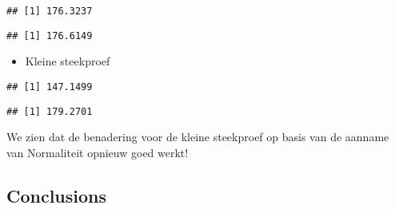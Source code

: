 \documentclass[
  12pt,dutch,coursenotes]{book}
\newenvironment{Shaded}{\begin{snugshade}}{\end{snugshade}}
\newcommand{\DataTypeTok}[1]{\textcolor[rgb]{0.13,0.29,0.53}{#1}}
\newcommand{\DecValTok}[1]{\textcolor[rgb]{0.00,0.00,0.81}{#1}}
\newcommand{\FloatTok}[1]{\textcolor[rgb]{0.00,0.00,0.81}{#1}}
\newcommand{\KeywordTok}[1]{\textcolor[rgb]{0.13,0.29,0.53}{\textbf{#1}}}
\newcommand{\NormalTok}[1]{#1}
\newcommand{\OperatorTok}[1]{\textcolor[rgb]{0.81,0.36,0.00}{\textbf{#1}}}
\newcommand{\StringTok}[1]{\textcolor[rgb]{0.31,0.60,0.02}{#1}}
\providecommand{\tightlist}{%
  \setlength{\itemsep}{0pt}\setlength{\parskip}{0pt}}
\theoremstyle{definition}
\theoremstyle{definition}
\theoremstyle{definition}
\theoremstyle{remark}
\begin{document}
\begin{verbatim}
## [1] 176.3237
\end{verbatim}

\begin{Shaded}
\end{Shaded}

\begin{verbatim}
## [1] 176.6149
\end{verbatim}

\begin{itemize}
\tightlist
\item
  Kleine steekproef
\end{itemize}

\begin{Shaded}
\end{Shaded}

\begin{verbatim}
## [1] 147.1499
\end{verbatim}

\begin{Shaded}
\end{Shaded}

\begin{verbatim}
## [1] 179.2701
\end{verbatim}

We zien dat de benadering voor de kleine steekproef op basis van de aanname van Normaliteit opnieuw goed werkt!

\hypertarget{conclusions}{%
\subsection{Conclusions}\label{conclusions}}
\end{document}
